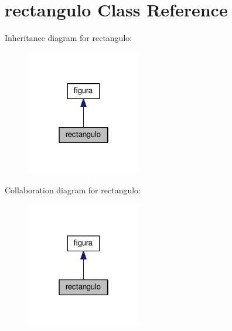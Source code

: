 \hypertarget{classrectangulo}{}\section{rectangulo Class Reference}
\label{classrectangulo}


Inheritance diagram for rectangulo\+:\nopagebreak
\begin{figure}[H]
\begin{center}
\leavevmode
\includegraphics[width=142pt]{classrectangulo__inherit__graph}
\end{center}
\end{figure}


Collaboration diagram for rectangulo\+:\nopagebreak
\begin{figure}[H]
\begin{center}
\leavevmode
\includegraphics[width=142pt]{classrectangulo__coll__graph}
\end{center}
\end{figure}
